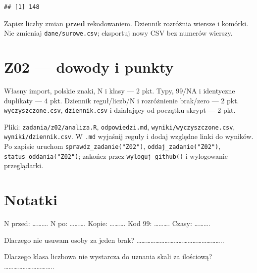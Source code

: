 \documentclass[
  polish,
  11pt,
  a4paper,
]{article}
\begin{document}
\begin{verbatim}
## [1] 148
\end{verbatim}

Zapisz liczby zmian \textbf{przed} rekodowaniem. Dziennik rozróżnia
wiersze i komórki. Nie zmieniaj \texttt{dane/surowe.csv}; eksportuj nowy
CSV bez numerów wierszy.

\section{Z02 --- dowody i punkty}\label{z02-dowody-i-punkty}

Własny import, polskie znaki, N i klasy --- 2 pkt. Typy, 99/NA i
identyczne duplikaty --- 4 pkt. Dziennik reguł/liczb/N i rozróżnienie
brak/zero --- 2 pkt. \texttt{wyczyszczone.csv}, \texttt{dziennik.csv} i
działający od początku skrypt --- 2 pkt.

Pliki: \texttt{zadania/z02/analiza.R}, \texttt{odpowiedzi.md},
\texttt{wyniki/wyczyszczone.csv}, \texttt{wyniki/dziennik.csv}. W
\texttt{.md} wyjaśnij reguły i dodaj względne linki do wyników. Po
zapisie uruchom \texttt{sprawdz\_zadanie("Z02")},
\texttt{oddaj\_zadanie("Z02")}, \texttt{status\_oddania("Z02")}; zakończ
przez \texttt{wyloguj\_github()} i wylogowanie przeglądarki.

\section{Notatki}\label{notatki}

N przed: \ldots\ldots\ldots. N po: \ldots\ldots\ldots. Kopie:
\ldots\ldots\ldots. Kod 99: \ldots\ldots\ldots. Czasy:
\ldots\ldots\ldots.

Dlaczego nie usuwam osoby za jeden brak?
\ldots\ldots\ldots\ldots\ldots\ldots\ldots\ldots\ldots\ldots\ldots\ldots\ldots\ldots\ldots\ldots\ldots\ldots..

Dlaczego klasa liczbowa nie wystarcza do uznania skali za ilościową?
\ldots\ldots\ldots\ldots\ldots\ldots\ldots\ldots\ldots\ldots..
\end{document}
